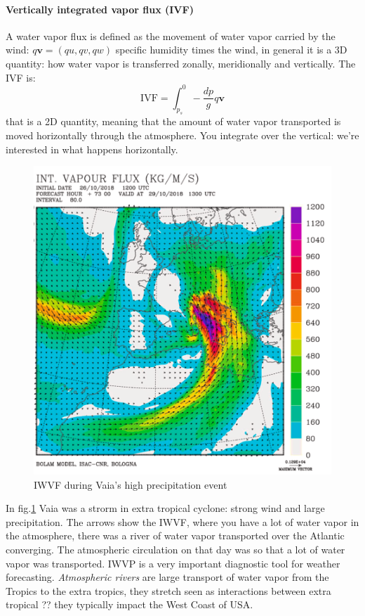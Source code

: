 \paragraph{Vertically integrated vapor flux (IVF)} A water vapor flux is defined as the movement of water vapor carried by the wind: $q\mathbf{v}=(qu,qv,qw)$ specific humidity times the wind, in general it is a 3D quantity: how water vapor is transferred zonally, meridionally and vertically. The IVF is:
\begin{equation}
    \text{IVF}=\int_{p_s}^0-\frac{dp}{g}q\mathbf{v}
\end{equation}
that is a 2D quantity, meaning that the amount of water vapor transported is moved horizontally through the atmosphere. You integrate over the vertical: we're interested in what happens horizontally.
\begin{figure}[htpb]
    \centering
    \includegraphics[width=0.5\linewidth]{uploads/VAIA.png}
    \caption{IWVF during Vaia’s high precipitation event }
    \label{fig:VAIA}
\end{figure}
In fig.\ref{fig:VAIA} Vaia was a strorm in extra tropical cyclone: strong wind and large precipitation. The arrows show the IWVF, where you have a lot of water vapor in the atmosphere, there was a river of water vapor transported over the Atlantic converging. The atmospheric circulation on that day was so that a lot of water vapor was transported. IWVP is a very important diagnostic tool for weather forecasting. \textit{Atmospheric rivers} are large transport of water vapor from the Tropics to the extra tropics, they stretch seen as interactions between extra tropical ?? they typically impact the West Coast of USA. 

